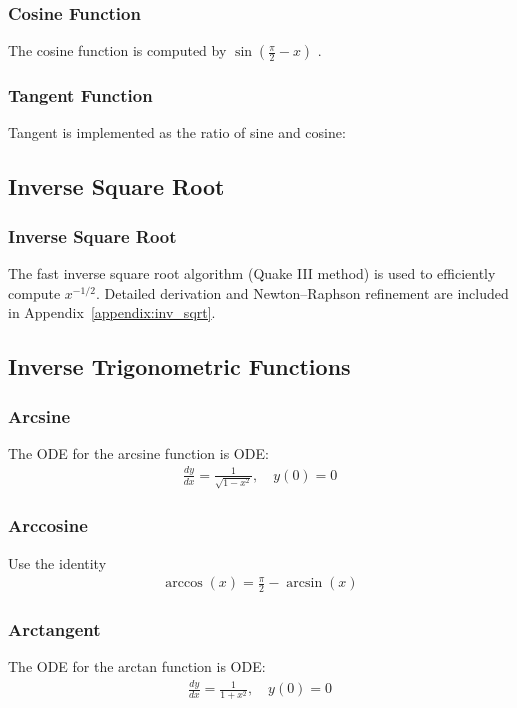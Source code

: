 \documentclass[conference]{IEEEtran}
\begin{document}
\subsubsection{Cosine Function} 
The cosine function \cite{ncert12} is computed by $\sin(\frac{\pi}{2} - x)$ .



\subsubsection{Tangent Function} 
Tangent \cite{ncert12} is implemented as the ratio of sine and cosine:

\subsection{Inverse Square Root}

\subsubsection{Inverse Square Root}
The fast inverse square root algorithm (Quake III method) is used to efficiently compute $x^{-1/2}$. 
Detailed derivation and Newton–Raphson refinement are included in Appendix~\ref{appendix:inv_sqrt}.

\subsection{Inverse Trigonometric Functions}
\subsubsection{Arcsine} 
The ODE for the arcsine function \cite{ncert12} is
ODE:
\begin{align}
\frac{dy}{dx} = \frac{1}{\sqrt{1-x^2}}, \quad y(0)=0
\end{align}

\subsubsection{Arccosine}
 Use the identity \cite{ncert12}
\begin{align}
   \arccos(x) = \frac{\pi}{2} - \arcsin(x) 
\end{align}

\subsubsection{Arctangent}
The ODE for the arctan function \cite{ncert12} is
ODE:
\begin{align}
\frac{dy}{dx} = \frac{1}{1+x^2}, \quad y(0)=0
\end{align}
\end{document}
